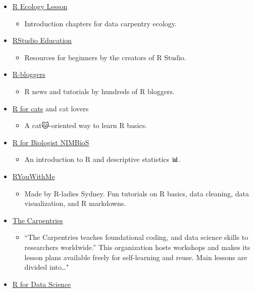 \documentclass[
]{book}
\providecommand{\tightlist}{%
  \setlength{\itemsep}{0pt}\setlength{\parskip}{0pt}}
\begin{document}
\begin{itemize}
\item
  \href{https://datacarpentry.org/R-ecology-lesson/index.html}{R Ecology Lesson}

  \begin{itemize}
  \tightlist
  \item
    Introduction chapters for data carpentry ecology.
  \end{itemize}
\item
  \href{https://education.rstudio.com/learn/beginner/}{RStudio Education}

  \begin{itemize}
  \tightlist
  \item
    Resources for beginners by the creators of R Studio.
  \end{itemize}
\item
  \href{https://www.r-bloggers.com/}{R-bloggers}

  \begin{itemize}
  \tightlist
  \item
    R news and tutorials by hundreds of R bloggers.
  \end{itemize}
\item
  \href{https://rforcats.net/}{R for cats} and cat lovers

  \begin{itemize}
  \tightlist
  \item
    A cat🐱-oriented way to learn R basics.
  \end{itemize}
\item
  \href{http://www.nimbios.org/products/prod_pdfs/RforBiologistv1.1.pdf}{R for Biologist NIMBioS}

  \begin{itemize}
  \tightlist
  \item
    An introduction to R and descriptive statistics 📊.
  \end{itemize}
\item
  \href{https://rladiessydney.org/courses/ryouwithme/}{RYouWithMe}

  \begin{itemize}
  \tightlist
  \item
    Made by R-ladies Sydney. Fun tutorials on R basics, data cleaning, data visualization, and R markdowns.
  \end{itemize}
\item
  \href{https://carpentries.org/}{The Carpentries}

  \begin{itemize}
  \tightlist
  \item
    ``The Carpentries teaches foundational coding, and data science skills to researchers worldwide.'' This organization hosts workshops and makes its lesson plans available freely for self-learning and reuse. Main lessons are divided into\ldots"
  \end{itemize}
\item
  \href{https://r4ds.had.co.nz/}{R for Data Science}


\end{itemize}
\end{document}
